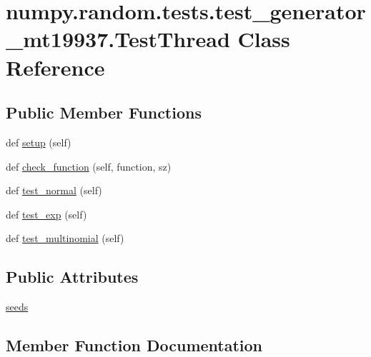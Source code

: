 \hypertarget{classnumpy_1_1random_1_1tests_1_1test__generator__mt19937_1_1TestThread}{}\section{numpy.\+random.\+tests.\+test\+\_\+generator\+\_\+mt19937.\+Test\+Thread Class Reference}
\label{classnumpy_1_1random_1_1tests_1_1test__generator__mt19937_1_1TestThread}
\subsection*{Public Member Functions}
\begin{DoxyCompactItemize}
\item 
def \hyperlink{classnumpy_1_1random_1_1tests_1_1test__generator__mt19937_1_1TestThread_a956d7f1e8046c9fcf2cb52f104fc54cc}{setup} (self)
\item 
def \hyperlink{classnumpy_1_1random_1_1tests_1_1test__generator__mt19937_1_1TestThread_a84bfe5284d6156540bd7b921d3854d2a}{check\+\_\+function} (self, function, sz)
\item 
def \hyperlink{classnumpy_1_1random_1_1tests_1_1test__generator__mt19937_1_1TestThread_a064451e08280d319d7ef49974afb6a5d}{test\+\_\+normal} (self)
\item 
def \hyperlink{classnumpy_1_1random_1_1tests_1_1test__generator__mt19937_1_1TestThread_a5a4e52c2f97260c1da9753e01f6ed847}{test\+\_\+exp} (self)
\item 
def \hyperlink{classnumpy_1_1random_1_1tests_1_1test__generator__mt19937_1_1TestThread_afc2143047995d95467090c587fef0d85}{test\+\_\+multinomial} (self)
\end{DoxyCompactItemize}
\subsection*{Public Attributes}
\begin{DoxyCompactItemize}
\item 
\hyperlink{classnumpy_1_1random_1_1tests_1_1test__generator__mt19937_1_1TestThread_adc08a3ff0533f4070ed1ad8bfb5be568}{seeds}
\end{DoxyCompactItemize}


\subsection{Member Function Documentation}
\mbox{\label{classnumpy_1_1random_1_1tests_1_1test__generator__mt19937_1_1TestThread_a84bfe5284d6156540bd7b921d3854d2a}} 
